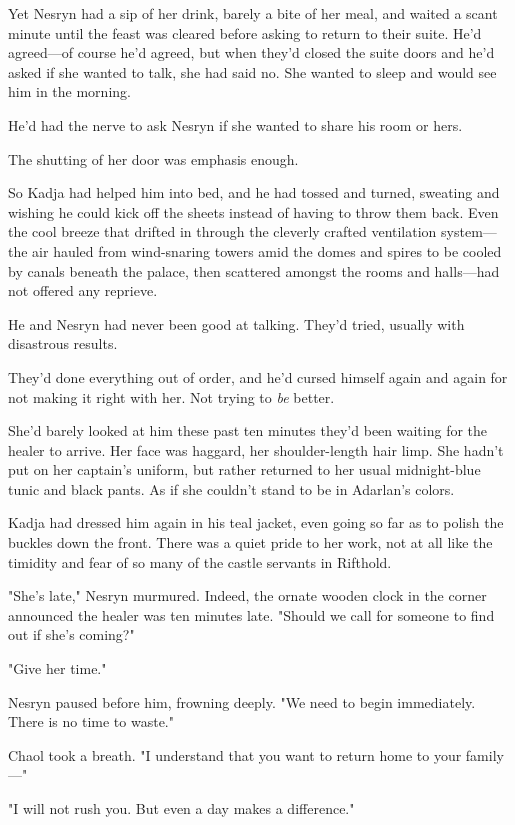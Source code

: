 Yet Nesryn had a sip of her drink, barely a bite of her meal, and waited a scant minute until the feast was cleared before asking to return to their suite.
He'd agreed---of course he'd agreed, but when they'd closed the suite doors and he'd asked if she wanted to talk, she had said no.
She wanted to sleep and would see him in the morning.

He'd had the nerve to ask Nesryn if she wanted to share his room or hers.

The shutting of her door was emphasis enough.

So Kadja had helped him into bed, and he had tossed and turned, sweating and wishing he could kick off the sheets instead of having to throw them back.
Even the cool breeze that drifted in through the cleverly crafted ventilation system---the air hauled from wind-snaring towers amid the domes and spires to be cooled by canals beneath the palace, then scattered amongst the rooms and halls---had not offered any reprieve.

He and Nesryn had never been good at talking.
They'd tried, usually with disastrous results.

They'd done everything out of order, and he'd cursed himself again and again for not making it right with her.
Not trying to \emph{be} better.

She'd barely looked at him these past ten minutes they'd been waiting for the healer to arrive.
Her face was haggard, her shoulder-length hair limp.
She hadn't put on her captain's uniform, but rather returned to her usual midnight-blue tunic and black pants.
As if she couldn't stand to be in Adarlan's colors.

Kadja had dressed him again in his teal jacket, even going so far as to polish the buckles down the front.
There was a quiet pride to her work, not at all like the timidity and fear of so many of the castle servants in Rifthold.

"She's late," Nesryn murmured.
Indeed, the ornate wooden clock in the corner announced the healer was ten minutes late.
"Should we call for someone to find out if she's coming?"

"Give her time."

Nesryn paused before him, frowning deeply.
"We need to begin immediately.
There is no time to waste."

Chaol took a breath.
"I understand that you want to return home to your family---"

"I will not rush you.
But even a day makes a difference."

